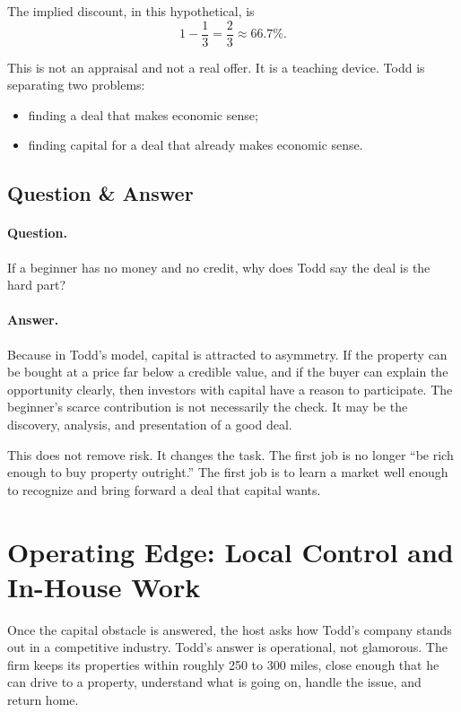 The implied discount, in this hypothetical, is
\begin{equation}
1-\frac{1}{3}
=
\frac{2}{3}
\approx 66.7\%.
\end{equation}

This is not an appraisal and not a real offer. It is a teaching device. Todd is separating two problems:
\begin{itemize}
\item finding a deal that makes economic sense;
\item finding capital for a deal that already makes economic sense.
\end{itemize}

\subsection{Question \& Answer}

\paragraph{Question.}
If a beginner has no money and no credit, why does Todd say the deal is the hard part?

\paragraph{Answer.}
Because in Todd's model, capital is attracted to asymmetry. If the property can be bought at a price far below a credible value, and if the buyer can explain the opportunity clearly, then investors with capital have a reason to participate. The beginner's scarce contribution is not necessarily the check. It may be the discovery, analysis, and presentation of a good deal.

This does not remove risk. It changes the task. The first job is no longer ``be rich enough to buy property outright.'' The first job is to learn a market well enough to recognize and bring forward a deal that capital wants.

\section{Operating Edge: Local Control and In-House Work}

Once the capital obstacle is answered, the host asks how Todd's company stands out in a competitive industry. Todd's answer is operational, not glamorous. The firm keeps its properties within roughly 250 to 300 miles, close enough that he can drive to a property, understand what is going on, handle the issue, and return home.

